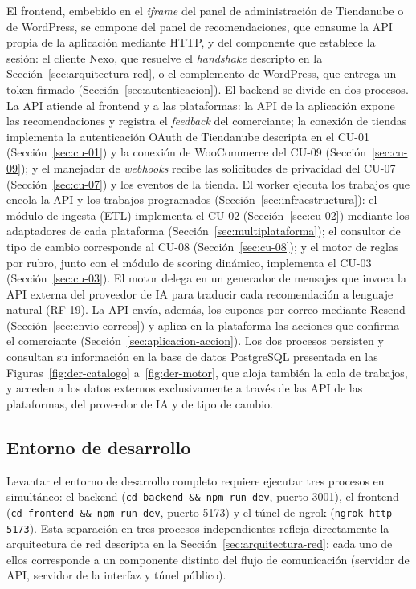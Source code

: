 El frontend, embebido en el \emph{iframe} del panel de administración de Tiendanube o de WordPress, se compone del panel de recomendaciones, que consume la API propia de la aplicación mediante HTTP, y del componente que establece la sesión: el cliente Nexo, que resuelve el \emph{handshake} descripto en la Sección~\ref{sec:arquitectura-red}, o el complemento de WordPress, que entrega un token firmado (Sección~\ref{sec:autenticacion}). El backend se divide en dos procesos. La API atiende al frontend y a las plataformas: la API de la aplicación expone las recomendaciones y registra el \emph{feedback} del comerciante; la conexión de tiendas implementa la autenticación OAuth de Tiendanube descripta en el CU-01 (Sección~\ref{sec:cu-01}) y la conexión de WooCommerce del CU-09 (Sección~\ref{sec:cu-09}); y el manejador de \emph{webhooks} recibe las solicitudes de privacidad del CU-07 (Sección~\ref{sec:cu-07}) y los eventos de la tienda. El worker ejecuta los trabajos que encola la API y los trabajos programados (Sección~\ref{sec:infraestructura}): el módulo de ingesta (ETL) implementa el CU-02 (Sección~\ref{sec:cu-02}) mediante los adaptadores de cada plataforma (Sección~\ref{sec:multiplataforma}); el consultor de tipo de cambio corresponde al CU-08 (Sección~\ref{sec:cu-08}); y el motor de reglas por rubro, junto con el módulo de scoring dinámico, implementa el CU-03 (Sección~\ref{sec:cu-03}). El motor delega en un generador de mensajes que invoca la API externa del proveedor de IA para traducir cada recomendación a lenguaje natural (RF-19).
La API envía, además, los cupones por correo mediante Resend (Sección~\ref{sec:envio-correos}) y aplica en la plataforma las acciones que confirma el comerciante (Sección~\ref{sec:aplicacion-accion}).
 Los dos procesos persisten y consultan su información en la base de datos PostgreSQL presentada en las Figuras~\ref{fig:der-catalogo} a~\ref{fig:der-motor}, que aloja también la cola de trabajos, y acceden a los datos externos exclusivamente a través de las API de las plataformas, del proveedor de IA y de tipo de cambio.

\subsection{Entorno de desarrollo}
\label{sec:entorno-desarrollo}

Levantar el entorno de desarrollo completo requiere ejecutar tres procesos en simultáneo: el backend (\texttt{cd backend \&\& npm run dev}, puerto 3001), el frontend (\texttt{cd frontend \&\& npm run dev}, puerto 5173) y el túnel de ngrok (\texttt{ngrok http 5173}). Esta separación en tres procesos independientes refleja directamente la arquitectura de red descripta en la Sección~\ref{sec:arquitectura-red}: cada uno de ellos corresponde a un componente distinto del flujo de comunicación (servidor de API, servidor de la interfaz y túnel público).

